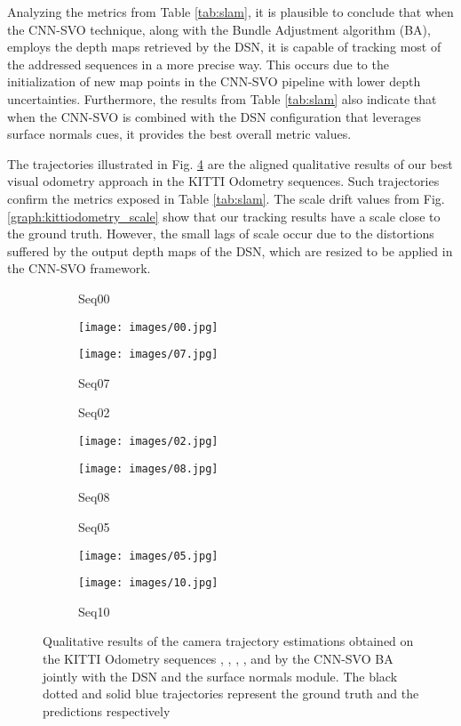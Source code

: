 \documentclass[5p]{elsarticle}
\begin{document}
Analyzing the metrics from Table \ref{tab:slam}, it is plausible to conclude that when the CNN-SVO technique, along with the Bundle Adjustment algorithm (BA), employs the depth maps retrieved by the DSN, it is capable of tracking most of the addressed sequences in a more precise way. This occurs due to the initialization of new map points in the CNN-SVO pipeline with lower depth uncertainties. Furthermore, the results from Table \ref{tab:slam} also indicate that when the CNN-SVO is combined with the DSN configuration that leverages surface normals cues, it provides the best overall metric values. 

The trajectories illustrated in Fig. \ref{subfig:trajall} are the aligned qualitative results of our best visual odometry approach in the KITTI Odometry sequences. Such trajectories confirm the metrics exposed in Table \ref{tab:slam}. The scale drift values from Fig. \ref{graph:kittiodometry_scale} show that our tracking results have a scale close to the ground truth. However, the small lags of scale occur due to the distortions suffered by the output depth maps of the DSN, which are resized to be applied in the CNN-SVO framework.


\begin{figure}[t!]
     \centering
          \begin{subfigure}[t]{0.15\textwidth}
         \centering
         \caption{Seq00}
         \texttt{[image: images/00.jpg]}
         \hspace{1em}
         \caption{Seq07}
         \texttt{[image: images/07.jpg]}
         \label{subfig:traj1}
     \end{subfigure}
     \begin{subfigure}[t]{0.15\textwidth}
         \centering
         \caption{Seq02}
         \texttt{[image: images/02.jpg]}
         \hspace{1em}
         \caption{Seq08}
         \texttt{[image: images/08.jpg]}
         \label{subfig:traj2}
     \end{subfigure}
         \begin{subfigure}[t]{0.15\textwidth}
         \centering
         \caption{Seq05}
         \texttt{[image: images/05.jpg]}
         \hspace{1em}
         \caption{Seq10}
         \texttt{[image: images/10.jpg]}
         \label{subfig:traj3}
     \end{subfigure}
     \caption{Qualitative results of the camera trajectory estimations obtained on the KITTI Odometry \cite{Geiger2012CVPR} sequences , , , ,  and  by the CNN-SVO  BA jointly with the DSN and the surface normals module. The black dotted and solid blue trajectories represent the ground truth and the predictions respectively}
     \label{subfig:trajall}
\end{figure}
\end{document}
